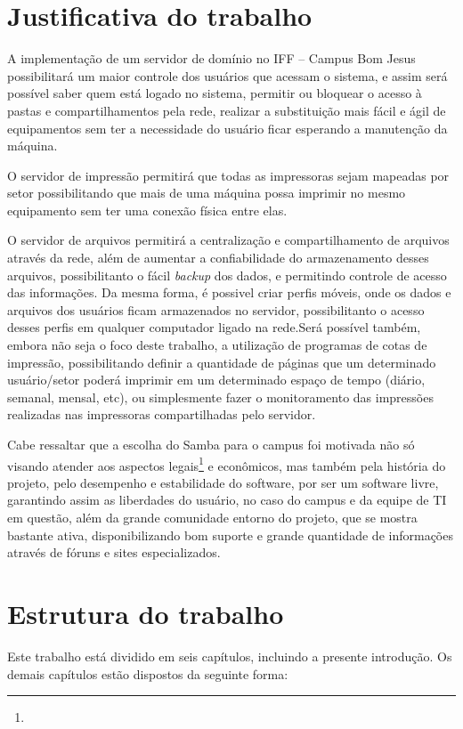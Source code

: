 \section{Justificativa do trabalho}

A implementação de um servidor de domínio no IFF – Campus Bom Jesus possibilitará um maior controle dos usuários que acessam o sistema, e assim será possível saber quem está logado no sistema, permitir ou bloquear o acesso à pastas e compartilhamentos pela rede, realizar a substituição mais fácil e ágil de equipamentos sem ter a necessidade do usuário ficar esperando a manutenção da máquina.

O servidor de impressão permitirá que todas as impressoras sejam mapeadas por setor possibilitando que mais de uma máquina possa imprimir no mesmo equipamento sem ter uma conexão física entre elas.

O servidor de arquivos permitirá a centralização e compartilhamento de arquivos através da rede, além de aumentar a confiabilidade do armazenamento desses arquivos, possibilitanto o fácil \textit{backup} dos dados, e permitindo controle de acesso das informações. Da mesma forma, é possivel criar perfis móveis, onde os dados e arquivos dos usuários ficam armazenados no servidor, possibilitanto o acesso desses perfis em qualquer computador ligado na rede.Será possível também, embora não seja o foco deste trabalho, a utilização de programas de cotas de impressão, possibilitando definir a quantidade de páginas que um determinado usuário/setor poderá imprimir em um determinado espaço de tempo (diário, semanal, mensal, etc), ou simplesmente fazer o monitoramento das impressões realizadas nas impressoras compartilhadas pelo servidor.

Cabe ressaltar que a escolha do Samba para o campus foi motivada não só visando atender aos aspectos legais\footnote[1]{} e econômicos, mas também pela história do projeto, pelo desempenho e estabilidade do software, por ser um software livre, garantindo assim as liberdades do usuário, no caso do campus e da equipe de TI em questão, além da grande comunidade entorno do projeto, que se mostra bastante ativa, disponibilizando bom suporte e grande quantidade de informações através de fóruns e sites especializados.

\section{Estrutura do trabalho}

Este trabalho está dividido em seis capítulos, incluindo a presente introdução. Os demais capítulos estão dispostos da seguinte forma:

